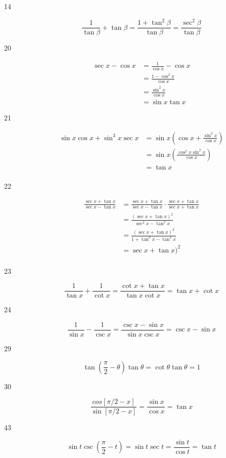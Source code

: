 \documentclass[fleqn,addpoints]{exam}
\begin{document}
\begin{description}
\item[14]
\[
  \frac{1}{\tan \beta} + \tan \beta = \frac{1 + \tan^2 \beta}{\tan \beta} = \frac{\sec^2 \beta}{\tan \beta}
\]

\item[20]
\begin{align*}
  \sec x - \cos x &= \frac{1}{\cos x} - \cos x \\
  &= \frac{1 - \cos^2 x}{\cos x} \\
  &= \frac{\sin^2 x}{\cos x} \\
  &= \sin x \tan x
\end{align*}

\item[21]
\begin{align*}
  \sin x \cos x + \sin^3 x \sec x &= \sin x ( \cos x + \frac{\sin^2 x}{\cos x}) \\
  &= \sin x \left( \frac{\cos^2 x \sin^2 x}{\cos x} \right) \\
  &= \tan x \\
\end{align*}

\item[22]
\begin{align*}
  \frac{\sec x + \tan x}{\sec x - \tan x} &= \frac{\sec x + \tan x}{\sec x - \tan x} \cdot \frac{\sec x + \tan x}{\sec x + \tan x} \\
  &= \frac{(\sec x + \tan x)^2}{\sec^2 x - \tan^2 x} \\
  &= \frac{(\sec x + \tan x)^2}{1 + \tan^2 x - \tan^2 x} \\
  &= \sec x + \tan x)^2 \\
\end{align*}

\item[23]
\[
  \frac{1}{\tan x} + \frac{1}{\cot x} = \frac{\cot x + \tan x}{\tan x \cot x} = \tan x + \cot x
\]

\item[24]
\[
  \frac{1}{\sin x} - \frac{1}{\csc x} = \frac{\csc x - \sin x}{\sin x \csc x} = \csc x - \sin x
\]

\item[29]
\[
  \tan \left( \frac{\pi}{2} - \theta \right) \tan \theta = \cot \theta \tan \theta = 1
\]

\item[30]
\[
  \frac{cos[\pi/2 - x]}{\sin[\pi/2 - x]} = \frac{\sin x}{\cos x} = \tan x
\]

\item[43]
\[
  \sin t \csc \left( \frac{\pi}{2} - t \right) = \sin t \sec t = \frac{\sin t}{\cos t} = \tan t
\]


\end{description}
\end{document}
